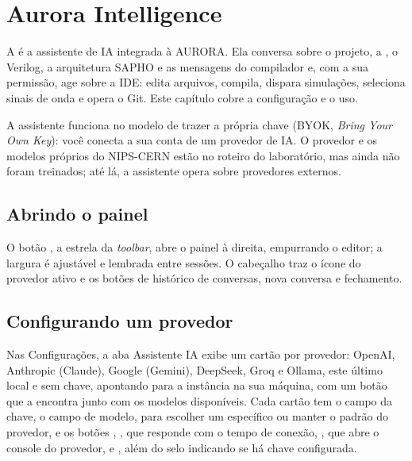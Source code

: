 \chapter{Aurora Intelligence}
\label{cap:aurora-intelligence}

A  é a assistente de IA integrada à AURORA. Ela conversa sobre o projeto, a \cmm{}, o Verilog, a arquitetura SAPHO e as mensagens do compilador e, com a sua permissão, age sobre a IDE: edita arquivos, compila, dispara simulações, seleciona sinais de onda e opera o Git. Este capítulo cobre a configuração e o uso.

\begin{info}
A assistente funciona no modelo de trazer a própria chave (BYOK, \textit{Bring Your Own Key}): você conecta a sua conta de um provedor de IA. O provedor e os modelos próprios do NIPS-CERN estão no roteiro do laboratório, mas ainda não foram treinados; até lá, a assistente opera sobre provedores externos.
\end{info}

\section{Abrindo o painel}

O botão , a estrela da \textit{toolbar}, abre o painel à direita, empurrando o editor; a largura é ajustável e lembrada entre sessões. O cabeçalho traz o ícone do provedor ativo e os botões de histórico de conversas, nova conversa e fechamento.


\section{Configurando um provedor}
\label{sec:ai-config}

Nas Configurações, a aba Assistente IA exibe um cartão por provedor: OpenAI, Anthropic (Claude), Google (Gemini), DeepSeek, Groq e Ollama, este último local e sem chave, apontando para a instância na sua máquina, com um botão  que a encontra junto com os modelos disponíveis. Cada cartão tem o campo da chave, o campo de modelo, para escolher um específico ou manter o padrão do provedor, e os botões , , que responde com o tempo de conexão, , que abre o console do provedor, e , além do selo indicando se há chave configurada.

